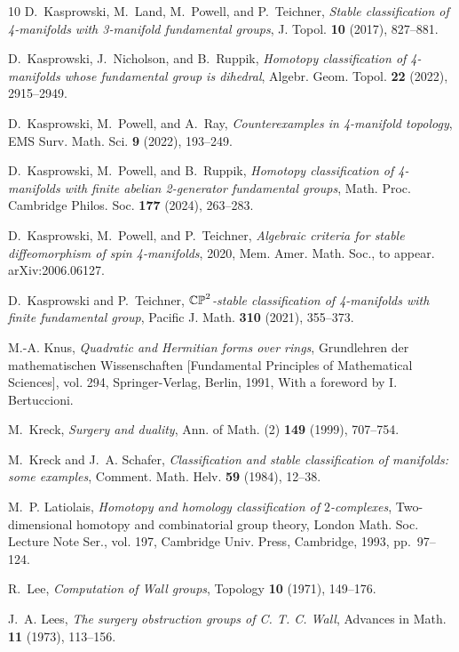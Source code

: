 \documentclass[11pt,a4paper,leqno]{amsart}
\theoremstyle{definition}
\theoremstyle{remark}
\begin{document}
\begin{thebibliography}{10}
D.~Kasprowski, M.~Land, M.~Powell, and P.~Teichner, \emph{Stable classification
  of 4-manifolds with 3-manifold fundamental groups}, J. Topol. \textbf{10}
  (2017), 827--881.

D.~Kasprowski, J.~Nicholson, and B.~Ruppik, \emph{Homotopy classification of
  4-manifolds whose fundamental group is dihedral}, Algebr. Geom. Topol.
  \textbf{22} (2022), 2915--2949.

D.~Kasprowski, M.~Powell, and A.~Ray, \emph{Counterexamples in 4-manifold
  topology}, EMS Surv. Math. Sci. \textbf{9} (2022), 193--249.

D.~Kasprowski, M.~Powell, and B.~Ruppik, \emph{Homotopy classification of
  4-manifolds with finite abelian 2-generator fundamental groups}, Math. Proc.
  Cambridge Philos. Soc. \textbf{177} (2024), 263--283.

D.~Kasprowski, M.~Powell, and P.~Teichner, \emph{Algebraic criteria for stable
  diffeomorphism of spin 4-manifolds}, 2020, Mem. Amer. Math. Soc., to appear.
  arXiv:2006.06127.

D.~Kasprowski and P.~Teichner, \emph{{$\Bbb{CP}^2$}-stable classification of
  4-manifolds with finite fundamental group}, Pacific J. Math. \textbf{310}
  (2021), 355--373.

M.-A. Knus, \emph{Quadratic and {H}ermitian forms over rings}, Grundlehren der
  mathematischen Wissenschaften [Fundamental Principles of Mathematical
  Sciences], vol. 294, Springer-Verlag, Berlin, 1991, With a foreword by I.
  Bertuccioni.

M.~Kreck, \emph{Surgery and duality}, Ann. of Math. (2) \textbf{149} (1999),
  707--754.

M.~Kreck and J.~A. Schafer, \emph{Classification and stable classification of
  manifolds: some examples}, Comment. Math. Helv. \textbf{59} (1984), 12--38.

M.~P. Latiolais, \emph{Homotopy and homology classification of
  {$2$}-complexes}, Two-dimensional homotopy and combinatorial group theory,
  London Math. Soc. Lecture Note Ser., vol. 197, Cambridge Univ. Press,
  Cambridge, 1993, pp.~97--124.

R.~Lee, \emph{Computation of {W}all groups}, Topology \textbf{10} (1971),
  149--176.

J.~A. Lees, \emph{The surgery obstruction groups of {C}. {T}. {C}. {W}all},
  Advances in Math. \textbf{11} (1973), 113--156.


\end{thebibliography}
\end{document}
